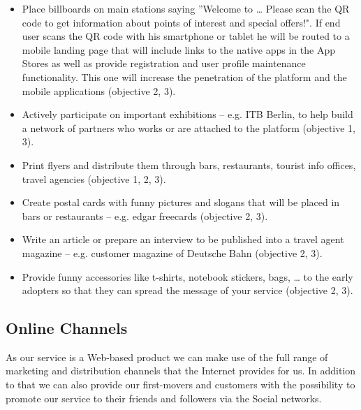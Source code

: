 \documentclass[a4paper]{article}
\begin{document}
\begin{itemize}

\item   Place billboards on main stations saying ''Welcome to … Please scan the QR code to get information about points of interest and special offers!". If end user scans the QR code with his smartphone or tablet he will be routed to a mobile landing page that will include links to the native apps in the App Stores as well as provide registration and user profile maintenance functionality. This one will increase the penetration of the platform and the mobile applications (objective 2, 3).

\item  Actively participate on important exhibitions --­ e.g. ITB Berlin, to help build a network of partners who works or are attached to the platform (objective 1, 3).

\item  Print flyers and distribute them through bars, restaurants, tourist info offices, travel agencies (objective 1, 2, 3).

\item  Create postal cards with funny pictures and slogans that will be placed in bars or restaurants --­ e.g. edgar freecards (objective 2, 3).

\item  Write an article or prepare an interview to be published into a travel agent magazine --­ e.g. customer magazine of Deutsche Bahn (objective 2, 3).

\item  Provide funny accessories like t-­shirts, notebook stickers, bags, … to the early adopters so that they can spread the message of your service (objective 2, 3).

\end{itemize}

\subsection{Online Channels}

As our service is a Web-based product we can make use of the full range of marketing and distribution channels that the Internet provides for us. In addition to that we can also provide our first-movers and customers with the possibility to promote our service to their friends and followers via the Social networks.
\end{document}

